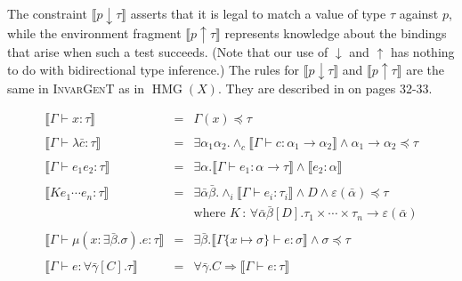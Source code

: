 \documentclass{article}
\newcommand{\colons}{\,:\,}
\newcommand{\tmname}[1]{\textsc{#1}}
\newcommand{\tmop}[1]{\ensuremath{\operatorname{#1}}}
\begin{document}
The constraint $\llbracket p \downarrow \tau \rrbracket$ asserts that it is
legal to match a value of type $\tau$ against $p$, while the environment
fragment $\llbracket p \uparrow \tau \rrbracket$ represents knowledge about
the bindings that arise when such a test succeeds. (Note that our use of
$\downarrow$ and $\uparrow$ has nothing to do with bidirectional type
inference.) The rules for $\llbracket p \downarrow \tau \rrbracket$ and
$\llbracket p \uparrow \tau \rrbracket$ are the same in {\tmname{InvarGenT}}
as in $\tmop{HMG} (X)$. They are described in
{\cite{simonet-pottier-hmg-toplas}} on pages 32-33.\begin{table}[t]
  \begin{eqnarray*}
    \llbracket \Gamma \vdash x : \tau \rrbracket & = & \Gamma (x) \preccurlyeq
    \tau\\
    &  & \\
    \llbracket \Gamma \vdash \lambda \bar{c} : \tau \rrbracket & = & \exists
    \alpha_1 \alpha_2 . \wedge_c \llbracket \Gamma \vdash c : \alpha_1
    \rightarrow \alpha_2 \rrbracket \wedge \alpha_1 \rightarrow \alpha_2
    \preccurlyeq \tau\\
    &  & \\
    \llbracket \Gamma \vdash e_1 e_2 : \tau \rrbracket & = & \exists \alpha .
    \llbracket \Gamma \vdash e_1 : \alpha \rightarrow \tau \rrbracket \wedge
    \llbracket e_2 : \alpha \rrbracket\\
    &  & \\
    \llbracket K e_1 \cdots e_n : \tau \rrbracket & = & \exists \bar{\alpha}
    \bar{\beta} . \wedge_i \llbracket \Gamma \vdash e_i : \tau_i \rrbracket
    \wedge D \wedge \varepsilon (\bar{\alpha}) \preccurlyeq \tau\\
    &  & \text{where } K \colons \forall \bar{\alpha} \bar{\beta} [D] .
    \tau_1 \times \cdots \times \tau_n \rightarrow \varepsilon
    (\bar{\alpha})\\
    &  & \\
    \llbracket \Gamma \vdash \mu (x : \exists \bar{\beta} . \sigma) .e : \tau
    \rrbracket & = & \exists \bar{\beta} . \llbracket \Gamma \{ x \mapsto
    \sigma \} \vdash e : \sigma \rrbracket \wedge \sigma \preccurlyeq \tau\\
    &  & \\
    \llbracket \Gamma \vdash e : \forall \bar{\gamma} [C] . \tau \rrbracket &
    = & \forall \bar{\gamma} .C \Rightarrow \llbracket \Gamma \vdash e : \tau
    \rrbracket\\
    &  & \\

\end{eqnarray*}
\end{table}
\end{document}

